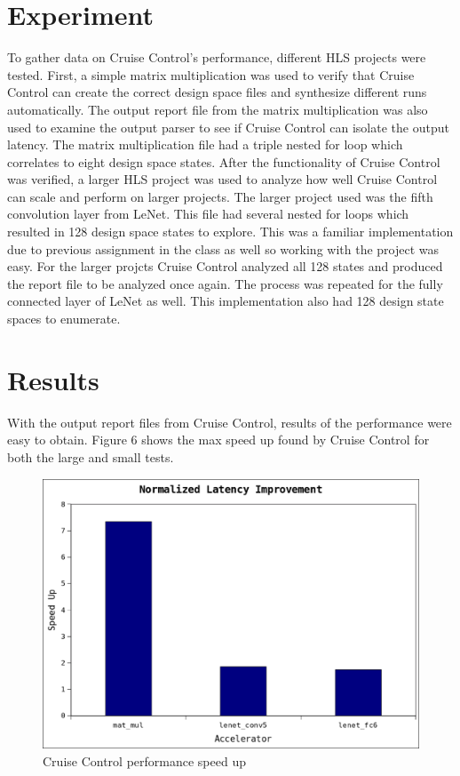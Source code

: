 \documentclass[letterpaper, 10 pt, conference]{IEEEconf}  %
\begin{document}
\section{Experiment}
To gather data on Cruise Control's performance, different HLS projects were tested. First, a simple matrix multiplication was used to verify that Cruise Control can create the correct design space files and synthesize different runs automatically. The output report file from the matrix multiplication was also used to examine the output parser to see if Cruise Control can isolate the output latency. The matrix multiplication file had a triple nested for loop which correlates to eight design space states. \newline 
\indent After the functionality of Cruise Control was verified, a larger HLS project was used to analyze how well Cruise Control can scale and perform on larger projects. The larger project used was the fifth convolution layer from LeNet. This file had several nested for loops which resulted in 128 design space states to explore. This was a familiar implementation due to previous assignment in the class as well so working with the project was easy. For the larger projcts Cruise Control analyzed all 128 states and produced the report file to be analyzed once again. The process was repeated for the fully connected layer of LeNet as well. This implementation also had 128 design state spaces to enumerate.  


\section{Results}
With the output report files from Cruise Control, results of the performance were easy to obtain. Figure 6 shows the max speed up found by Cruise Control for both the large and small tests. 

\begin{figure}[H]
\centering
\includegraphics[scale=.35]{result0.png} 
\caption{Cruise Control performance speed up}
\end{figure}
\end{document}
